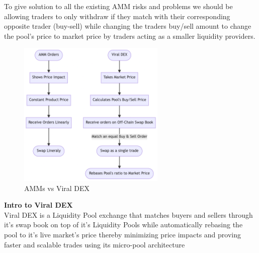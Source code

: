 \documentclass[conference]{IEEEtran}
\begin{document}
To give solution to all the existing AMM risks and problems we should be allowing traders to only withdraw if they match with their corresponding opposite trader (buy-sell) while changing the traders buy/sell amount to change the pool's price to market price by traders acting as a smaller liquidity providers. \\

\begin{figure}[H]
\begin{center}
\includegraphics[width=7cm]{dex}
\caption{AMMs vs Viral DEX}
\end{center}
\end{figure}

\textbf{Intro to Viral DEX}\\

Viral DEX is a Liquidity Pool exchange that matches buyers and sellers through it's swap book on top of it's Liquidity Pools while automatically rebasing the pool to it's live market's price thereby minimizing price impacts and proving faster and scalable trades using its micro-pool architecture\\
\end{document}
